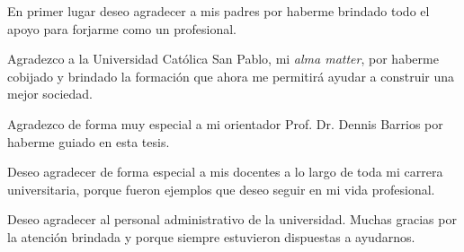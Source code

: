 \begin{agradecimientos}
En primer lugar deseo agradecer a mis padres por haberme brindado todo el apoyo para forjarme como un profesional.

Agradezco a la Universidad Católica San Pablo, mi \textit{alma matter}, por haberme cobijado y brindado la formación que ahora me permitirá ayudar a construir una mejor sociedad.

Agradezco de forma muy especial a mi orientador Prof. Dr. Dennis Barrios por haberme guiado en esta tesis.

Deseo agradecer de forma especial a mis docentes a lo largo de toda mi carrera universitaria, porque fueron ejemplos que deseo seguir en mi vida profesional.

Deseo agradecer al personal administrativo de la universidad. Muchas gracias por la atención brindada y porque siempre estuvieron dispuestas a ayudarnos.
\end{agradecimientos}
